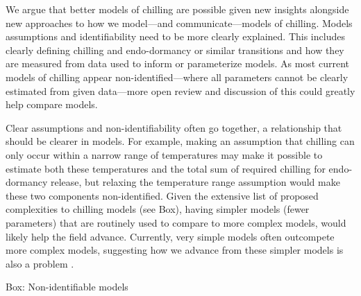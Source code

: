 \documentclass[11pt]{article}
\begin{document}
We argue that better models of chilling are possible given new insights alongside new approaches to how we model---and communicate---models of chilling. Models assumptions and identifiability need to be more clearly explained. This includes clearly defining chilling and endo-dormancy or similar transitions and how they are measured from data used to inform or parameterize models. As most current models of chilling appear non-identified---where all parameters cannot be clearly estimated from given data---more open review and discussion of this could greatly help compare models. 

Clear assumptions and non-identifiability often go together, a relationship that should be clearer in models. For example, making an assumption that chilling can only occur within a narrow range of temperatures may make it possible to estimate both these temperatures and the total sum of required chilling for endo-dormancy release, but relaxing the temperature range assumption would make these two components non-identified. Given the extensive list of proposed complexities to chilling models (see Box), having simpler models (fewer parameters) that are routinely used to compare to more complex models, would likely help the field advance. Currently, very simple models often outcompete more complex models, suggesting how we advance from these simpler models is also a problem \citep[e.g.,][]{basler2016evaluating}. 



\vspace{10ex}

{\sc Box: Non-identifiable models} %
\end{document}
